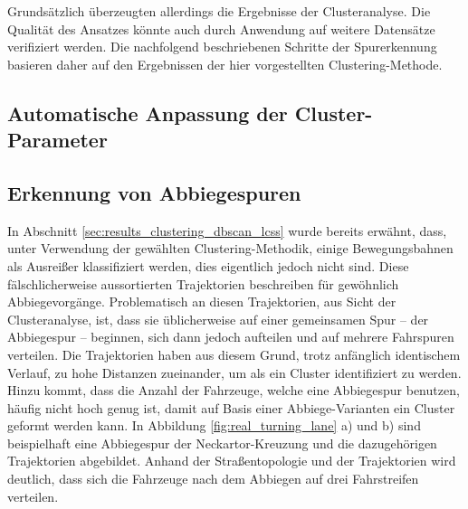 Grundsätzlich überzeugten allerdings die Ergebnisse der Clusteranalyse. Die Qualität des Ansatzes könnte auch
durch Anwendung auf weitere Datensätze verifiziert werden. Die nachfolgend beschriebenen Schritte der Spurerkennung
basieren daher auf den Ergebnissen der hier vorgestellten Clustering-Methode.

\subsection{Automatische Anpassung der Cluster-Parameter}



\subsection{Erkennung von Abbiegespuren}
\label{sec:real_detect_turning_lane}

In Abschnitt \ref{sec:results_clustering_dbscan_lcss} wurde bereits erwähnt, dass, unter Verwendung der
gewählten Clustering-Methodik, einige Bewegungsbahnen als Ausreißer klassifiziert werden, dies eigentlich jedoch
nicht sind. Diese fälschlicherweise aussortierten Trajektorien beschreiben für gewöhnlich Abbiegevorgänge.
Problematisch an diesen Trajektorien, aus Sicht der Clusteranalyse, ist, dass sie üblicherweise auf einer
gemeinsamen Spur -- der Abbiegespur -- beginnen, sich dann jedoch aufteilen und auf mehrere Fahrspuren verteilen.
Die Trajektorien haben aus diesem Grund, trotz anfänglich identischem Verlauf, zu hohe Distanzen zueinander, um
als ein Cluster identifiziert zu werden. Hinzu kommt, dass die Anzahl der Fahrzeuge, welche eine Abbiegespur
benutzen, häufig nicht hoch genug ist, damit auf Basis einer Abbiege-Varianten ein Cluster geformt werden kann.
In Abbildung \ref{fig:real_turning_lane} a) und b) sind beispielhaft eine Abbiegespur der Neckartor-Kreuzung und
die dazugehörigen Trajektorien abgebildet. Anhand der Straßentopologie und der Trajektorien wird deutlich,
dass sich die Fahrzeuge nach dem Abbiegen auf drei Fahrstreifen verteilen.

